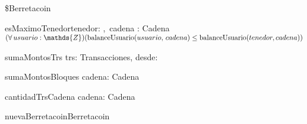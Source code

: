 \documentclass[10pt,a4paper]{article}
\begin{document}
\begin{tad}{\$Berretacoin}{}
    \begin{pred}{esMaximoTenedor}{tenedor: \tint,\, cadena : Cadena}
        $\begin{alignedat}{1}
        ( \forall\,usuario:\mathds{Z}) 
        ( \call{balanceUsuario}{usuario,\, cadena} \leq \call{balanceUsuario}{tenedor, cadena})
        \end{alignedat}$
    \end{pred}
    \medskip
    \medskip

    \begin{aux}{sumaMontosTrs}{%
      trs: Transacciones,
      desde: \tint
    }{\tint}
    \noindent{}
    \end{aux}
    \medskip
    \medskip

    \begin{aux}{sumaMontosBloques}{%
      cadena: Cadena
    }{\tint}
    \noindent{}
    \end{aux}
    \medskip
    \medskip

    \begin{aux}{cantidadTrsCadena}{%
      cadena: Cadena
    }{\tint}
    \noindent{}
    \end{aux}

    \pagebreak


\begin{proc}{nuevaBerretacoin}{}{Berretacoin}
\end{proc}


\end{tad}
\end{document}
